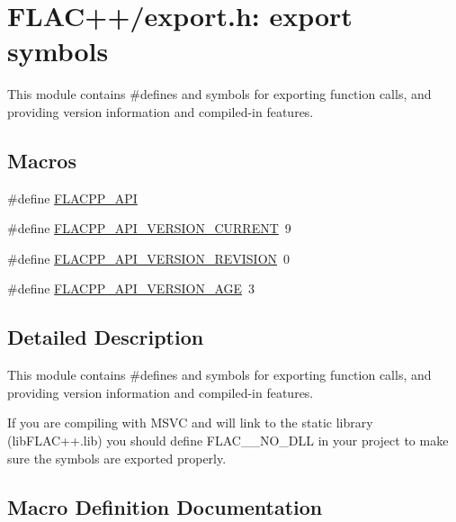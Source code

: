 \hypertarget{group__flacpp__export}{}\section{F\+L\+A\+C++/export.h\+: export symbols}
\label{group__flacpp__export}


This module contains \#defines and symbols for exporting function calls, and providing version information and compiled-\/in features.  


\subsection*{Macros}
\begin{DoxyCompactItemize}
\item 
\#define \hyperlink{group__flacpp__export_gaec3a801bf18630403eda6dc2f8c4927a}{F\+L\+A\+C\+P\+P\+\_\+\+A\+PI}
\item 
\#define \hyperlink{group__flacpp__export_gafc3064beba20c1795d8aaa801b79d3b6}{F\+L\+A\+C\+P\+P\+\_\+\+A\+P\+I\+\_\+\+V\+E\+R\+S\+I\+O\+N\+\_\+\+C\+U\+R\+R\+E\+NT}~9
\item 
\#define \hyperlink{group__flacpp__export_gaebce36e5325dbdcdc1a9e61a44606efe}{F\+L\+A\+C\+P\+P\+\_\+\+A\+P\+I\+\_\+\+V\+E\+R\+S\+I\+O\+N\+\_\+\+R\+E\+V\+I\+S\+I\+ON}~0
\item 
\#define \hyperlink{group__flacpp__export_ga17d0e89a961696b32c2b11e08663543f}{F\+L\+A\+C\+P\+P\+\_\+\+A\+P\+I\+\_\+\+V\+E\+R\+S\+I\+O\+N\+\_\+\+A\+GE}~3
\end{DoxyCompactItemize}


\subsection{Detailed Description}
This module contains \#defines and symbols for exporting function calls, and providing version information and compiled-\/in features. 

If you are compiling with M\+S\+VC and will link to the static library (lib\+F\+L\+A\+C++.lib) you should define F\+L\+A\+C\+\_\+\+\_\+\+N\+O\+\_\+\+D\+LL in your project to make sure the symbols are exported properly. 

\subsection{Macro Definition Documentation}
